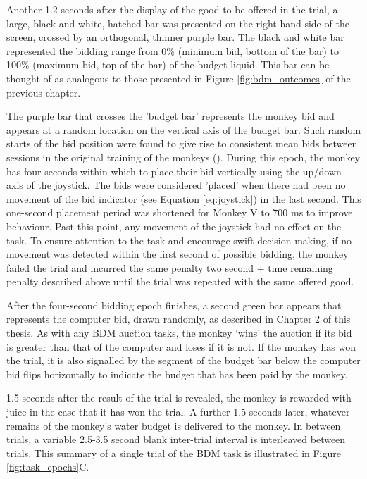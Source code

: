 Another 1.2 seconds after the display of the good to be offered in the trial, a large, black and white, hatched bar was presented on the right-hand side of the screen, crossed by an orthogonal, thinner purple bar. The black and white bar represented the bidding range from 0\% (minimum bid, bottom of the bar) to 100\% (maximum bid, top of the bar) of the budget liquid. This bar can be thought of as analogous to those presented in Figure \ref{fig:bdm_outcomes} of the previous chapter.

The purple bar that crosses the 'budget bar' represents the monkey bid and appears at a random location on the vertical axis of the budget bar. Such random starts of the bid position were found to give rise to consistent mean bids between sessions in the original training of the monkeys (\cite{almohammadRewardValueRevealed2022}). During this epoch, the monkey has four seconds within which to place their bid vertically using the up/down axis of the joystick. The bids were considered 'placed' when there had been no movement of the bid indicator (see Equation \ref{eq:joystick}) in the last second. This one-second placement period was shortened for Monkey V to 700 ms to improve behaviour. Past this point, any movement of the joystick had no effect on the task. To ensure attention to the task and encourage swift decision-making, if no movement was detected within the first second of possible bidding, the monkey failed the trial and incurred the same penalty two second + time remaining penalty described above until the trial was repeated with the same offered good.

After the four-second bidding epoch finishes, a second green bar appears that represents the computer bid, drawn randomly, as described in Chapter 2 of this thesis. As with any BDM auction tasks, the monkey ‘wins’ the auction if its bid is greater than that of the computer and loses if it is not. If the monkey has won the trial, it is also signalled by the segment of the budget bar below the computer bid flips horizontally to indicate the budget that has been paid by the monkey.

1.5 seconds after the result of the trial is revealed, the monkey is rewarded with juice in the case that it has won the trial. A further 1.5 seconds later, whatever remains of the monkey’s water budget is delivered to the monkey. In between trials, a variable 2.5-3.5 second blank inter-trial interval is interleaved between trials. This summary of a single trial of the BDM task is illustrated in Figure \ref{fig:task_epochs}C.

